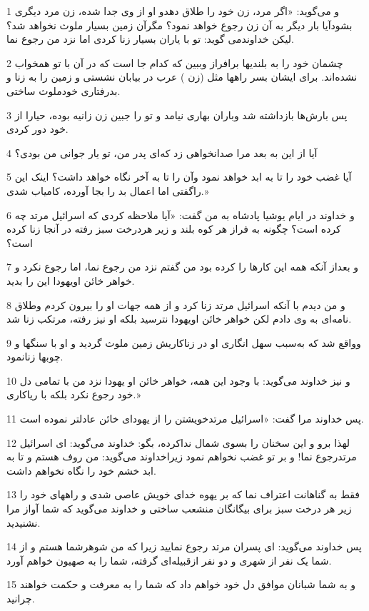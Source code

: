\par 1 و می‌گوید: «اگر مرد، زن خود را طلاق دهدو او از وی جدا شده، زن مرد دیگری بشودآیا بار دیگر به آن زن رجوع خواهد نمود؟ مگرآن زمین بسیار ملوث نخواهد شد؟ لیکن خداوندمی گوید: تو با یاران بسیار زنا کردی اما نزد من رجوع نما.
\par 2 چشمان خود را به بلندیها برافراز وببین که کدام جا است که در آن با تو همخواب نشده‌اند. برای ایشان بسر راهها مثل (زن ) عرب در بیابان نشستی و زمین را به زنا و بدرفتاری خودملوث ساختی.
\par 3 پس بارش‌ها بازداشته شد وباران بهاری نیامد و تو را جبین زن زانیه بوده، حیارا از خود دور کردی.
\par 4 آیا از این به بعد مرا صدانخواهی زد که‌ای پدر من، تو یار جوانی من بودی؟
\par 5 آیا غضب خود را تا به ابد خواهد نمود وآن را تا به آخر نگاه خواهد داشت؟ اینک این راگفتی اما اعمال بد را بجا آورده، کامیاب شدی.»
\par 6 و خداوند در ایام یوشیا پادشاه به من گفت: «آیا ملاحظه کردی که اسرائیل مرتد چه کرده است؟ چگونه به فراز هر کوه بلند و زیر هردرخت سبز رفته در آنجا زنا کرده است؟
\par 7 و بعداز آنکه همه این کارها را کرده بود من گفتم نزد من رجوع نما، اما رجوع نکرد و خواهر خائن اویهودا این را بدید.
\par 8 و من دیدم با آنکه اسرائیل مرتد زنا کرد و از همه جهات او را بیرون کردم وطلاق نامه‌ای به وی دادم لکن خواهر خائن اویهودا نترسید بلکه او نیز رفته، مرتکب زنا شد.
\par 9 وواقع شد که به‌سبب سهل انگاری او در زناکاریش زمین ملوث گردید و او با سنگها و چوبها زنانمود.
\par 10 و نیز خداوند می‌گوید: با وجود این همه، خواهر خائن او یهودا نزد من با تمامی دل خود رجوع نکرد بلکه با ریاکاری.»
\par 11 پس خداوند مرا گفت: «اسرائیل مرتدخویشتن را از یهودای خائن عادلتر نموده است.
\par 12 لهذا برو و این سخنان را بسوی شمال نداکرده، بگو: خداوند می‌گوید: ای اسرائیل مرتدرجوع نما! و بر تو غضب نخواهم نمود زیراخداوند می‌گوید: من روف هستم و تا به ابد خشم خود را نگاه نخواهم داشت.
\par 13 فقط به گناهانت اعتراف نما که بر یهوه خدای خویش عاصی شدی و راههای خود را زیر هر درخت سبز برای بیگانگان منشعب ساختی و خداوند می‌گوید که شما آواز مرا نشنیدید.
\par 14 پس خداوند می‌گوید: ای پسران مرتد رجوع نمایید زیرا که من شوهرشما هستم و از شما یک نفر از شهری و دو نفر ازقبیله‌ای گرفته، شما را به صهیون خواهم آورد.
\par 15 و به شما شبانان موافق دل خود خواهم داد که شما را به معرفت و حکمت خواهند چرانید.
